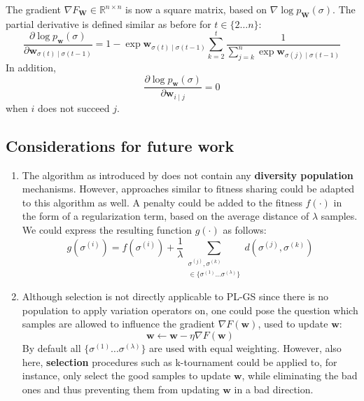 \documentclass[a4paper,10pt]{article}
\newcommand{\matr}[1]{\mathbf{#1}}
\begin{document}
	The gradient $\nabla F_\mathbf{\matr{W}} \in \mathbb{R}^{n\times n}$ is now a square matrix, based on $\nabla \log p_\matr{W}(\sigma)$. The partial derivative is defined similar as before for $t \in \{ 2 \dots n \}$:
	$$
	\frac{\partial \log p_\mathbf{w}(\sigma)}{\partial \matr{w}_{\sigma(t) \mid \sigma(t-1)}} = 1-\exp \matr{w}_{\sigma(t) \mid \sigma(t - 1)} \sum_{k=2}^t \frac{1}{\sum_{j=k}^n \exp \matr{w}_{\sigma(j) \mid \sigma(t - 1)}}
	$$
	In addition,
	$$
	\frac{\partial \log p_\mathbf{w}(\sigma)}{\partial \matr{w}_{i \mid j}} = 0
	$$
	when $i$ does not succeed $j$.
	
	\subsection{Considerations for future work}
	\begin{enumerate}
		\item
	The algorithm as introduced by \citeauthor{santucci_gradient_2020} does not contain any \textbf{diversity population }mechanisms. However, approaches similar to fitness sharing could be adapted to this algorithm as well. A penalty could be added to the fitness $f(\cdot)$ in the form of a regularization term, based on the average distance of $\lambda$ samples. We could express the resulting function $g(\cdot)$ as follows:
	$$
	g(\sigma^{(i)}) = f(\sigma^{(i)}) + \frac{1}{\lambda} \sum_{\substack{\sigma^{(j)}, \sigma^{(k)} \\ \in \{ \sigma^{(1)} \dots \sigma^{(\lambda)} \}}} d(\sigma^{(j)}, \sigma^{(k)})
	$$

	\item Although selection is not directly applicable to PL-GS since there is no population to apply variation operators on, one could pose the question which samples are allowed to influence the gradient $\nabla F\left(\mathbf{w}\right)$, used to update $\mathbf{w}$:
	$$\mathbf{w} \leftarrow \mathbf{w} - \eta \nabla F\left(\mathbf{w}\right)$$
	By default all $\{ \sigma^{(1)} \dots \sigma^{(\lambda)} \} $ are used with equal weighting. However, also here, \textbf{selection} procedures such as k-tournament could be applied to, for instance, only select the good samples to update $\mathbf{w}$, while eliminating the bad ones and thus preventing them from updating $\mathbf{w}$ in a bad direction.
	\end{enumerate}
		
%	
	
\end{document}

